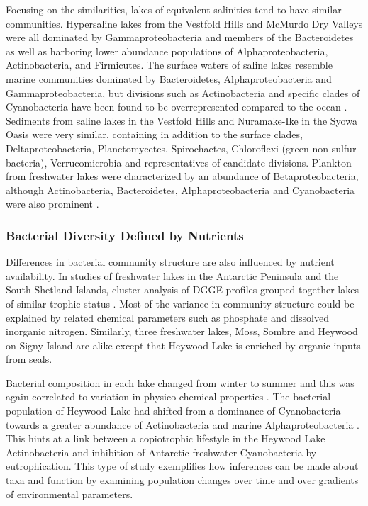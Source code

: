 Focusing on the similarities, lakes of equivalent salinities tend to have similar communities.
Hypersaline lakes from the Vestfold Hills \cite{Bowman2000b} and McMurdo Dry Valleys \cite{Glatz2006, Mosier2007} were all dominated by Gammaproteobacteria and members of the Bacteroidetes
 as well as harboring lower abundance populations of Alphaproteobacteria, Actinobacteria, and Firmicutes.
The surface waters of saline lakes resemble marine communities dominated by Bacteroidetes, Alphaproteobacteria and Gammaproteobacteria,
 but divisions such as Actinobacteria and specific clades of Cyanobacteria have been found to be overrepresented compared to the ocean \cite{Lauro2011}.
Sediments from saline lakes in the Vestfold Hills \cite{Bowman2000a} and Nuramake-Ike in the Syowa Oasis \cite{Kurasawa2010} were very similar, 
containing in addition to the surface clades, Deltaproteobacteria, Planctomycetes, Spirochaetes, Chloroflexi (green non-sulfur bacteria), Verrucomicrobia and representatives of candidate divisions.
Plankton from freshwater lakes were characterized by an abundance of Betaproteobacteria, 
although Actinobacteria, Bacteroidetes, Alphaproteobacteria and Cyanobacteria were also prominent \cite{Pearce2003, Pearce2005, Pearce2005, Schiaffino2009}. 

\subsubsection{Bacterial Diversity Defined by Nutrients}
Differences in bacterial community structure are also influenced by nutrient availability.
In studies of freshwater lakes in the Antarctic Peninsula and the South Shetland Islands, cluster analysis of DGGE profiles grouped together lakes of similar trophic status 
\cite{Schiaffino2009, Villaescusa2010}.
Most of the variance in community structure could be explained by related chemical parameters such as phosphate and dissolved inorganic nitrogen.
Similarly, three freshwater lakes, Moss, Sombre and Heywood on Signy Island are alike except that Heywood Lake is enriched by organic inputs from seals.

Bacterial composition in each lake changed from winter to summer and this was again correlated to variation in physico-chemical properties \cite{Pearce2005}. 
The bacterial population of Heywood Lake had shifted from a dominance of Cyanobacteria towards a greater abundance of Actinobacteria and marine Alphaproteobacteria \cite{Pearce2005}.
This hints at a link between a copiotrophic lifestyle in the Heywood Lake Actinobacteria and inhibition of Antarctic freshwater Cyanobacteria by eutrophication. 
This type of study exemplifies how inferences can be made about taxa and function by examining population changes over time and over gradients of environmental parameters.

